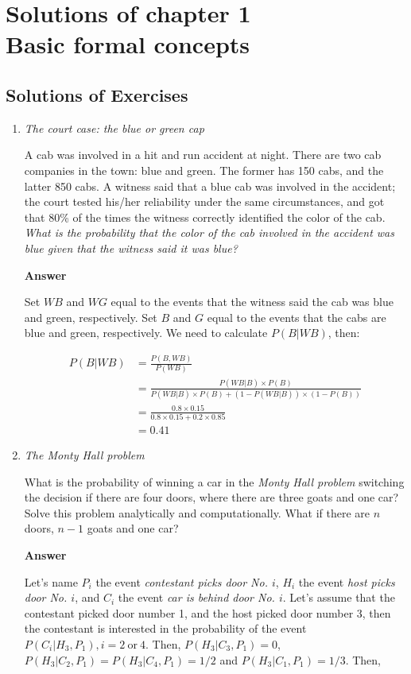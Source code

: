 \chapter{Solutions of chapter 1 \\
	Basic formal concepts}\label{chap1}
\section{Solutions of Exercises}\label{sec11}
\begin{enumerate}[leftmargin=*]
\item \textit{The court case: the blue or green cap}
	
A cab was involved in a hit and run accident at night. There are two cab companies in the town: blue and green. The former has 150 cabs, and the latter 850 cabs. A witness said that a blue cab was involved in the accident; the court tested his/her reliability under the same circumstances, and got that 80\% of the times the witness correctly identified the color of the cab. \textit{What is the probability that the color of the cab involved in the accident was blue given that the witness said it was blue?}
	
\textbf{Answer}
	
Set $WB$ and $WG$ equal to the events that the witness said the cab was blue and green, respectively. Set $B$ and $G$ equal to the events that the cabs are blue and green, respectively. We need to calculate $P(B|WB)$, then:
	
\begin{align}
	P(B|WB)&=\frac{P(B,WB)}{P(WB)}\\
	&=\frac{P(WB|B)\times P(B)}{P(WB|B)\times P(B)+(1-P(WB|B))\times (1-P(B))}\nonumber\\
	&=\frac{0.8\times 0.15}{0.8\times 0.15+0.2\times 0.85}\nonumber\\
	&=0.41\nonumber
\end{align}
	
	
\item \textit{The Monty Hall problem}
	
What is the probability of winning a car in the \textit{Monty Hall problem} switching the decision if there are four doors, where there are three goats and one car? Solve this problem analytically and computationally.  What if there are $n$ doors, $n-1$ goats and one car?
	
\textbf{Answer}
	
Let's name $P_i$ the event \textit{contestant picks door No. $i$}, $H_i$ the event \textit{host picks door No. $i$}, and $C_i$ the event \textit{car is behind door No. $i$}. Let's assume that the contestant picked door number 1, and the host picked door number 3, then the contestant is interested in the probability of the event $P(C_i|H_3,P_1), i = 2 \ \text{or} \ 4$. Then, $P(H_3|C_3,P_1)=0$, $P(H_3|C_2,P_1)=P(H_3|C_4,P_1)=1/2$ and $P(H_3|C_1,P_1)=1/3$. Then,  
	

\end{enumerate}
